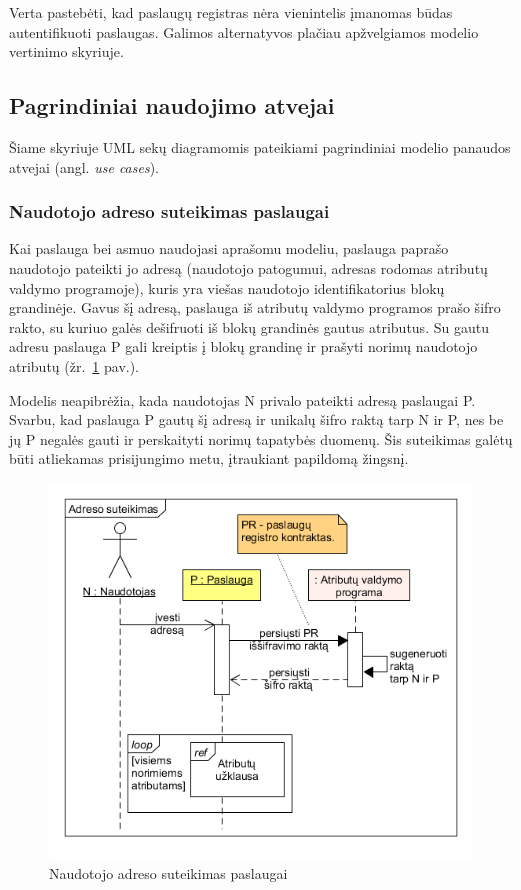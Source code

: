 Verta pastebėti, kad paslaugų registras nėra vienintelis įmanomas būdas autentifikuoti paslaugas. Galimos alternatyvos plačiau apžvelgiamos
modelio vertinimo \hypertarget{section:blockchainIDMevaluation}{skyriuje}.

\subsection{Pagrindiniai naudojimo atvejai}

Šiame skyriuje UML sekų diagramomis pateikiami pagrindiniai modelio panaudos atvejai (angl. \textit{use cases}).

\subsubsection{Naudotojo adreso suteikimas paslaugai}

Kai paslauga bei asmuo naudojasi aprašomu modeliu, paslauga paprašo naudotojo pateikti jo adresą (naudotojo patogumui, adresas rodomas
atributų valdymo programoje),
kuris yra viešas naudotojo identifikatorius blokų grandinėje.
Gavus šį adresą, paslauga iš atributų valdymo programos prašo šifro rakto, su kuriuo galės dešifruoti iš blokų grandinės gautus atributus.
Su gautu adresu paslauga P gali kreiptis į blokų grandinę ir prašyti norimų naudotojo atributų (žr.\hypertarget{fig:userGivesAddress}{~\ref{fig:userGivesAddress} pav.}).

Modelis neapibrėžia, kada naudotojas N privalo pateikti adresą paslaugai P. Svarbu, kad paslauga P gautų šį adresą ir unikalų šifro raktą tarp N ir P,
nes be jų P negalės gauti ir perskaityti norimų tapatybės duomenų. Šis suteikimas galėtų būti atliekamas prisijungimo metu, įtraukiant
papildomą žingsnį.

\begin{figure}[H]
    \centering
    \includegraphics[scale=0.6]{img/userGivesAddress}
    \caption{Naudotojo adreso suteikimas paslaugai}
    \label{fig:userGivesAddress}
\end{figure}

